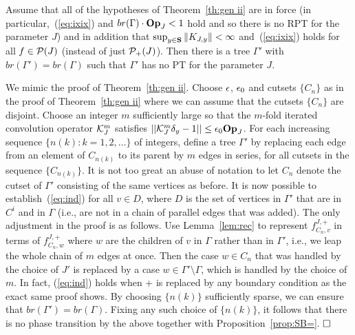 \begin{lem} \label{lem:robust}
Assume that all of the hypotheses of Theorem~\ref{th:gen ii} are in force
(in particular,~(\ref{eq:ixix}) and $\textstyle {br}  (\Gamma) \cdot \op < 1$ 
hold and so there is no RPT for the parameter $J$) and in addition that
$\sup_{y\in \S} \|K_{J,y}\| < \infty$ and~(\ref{eq:ixix}) holds for
all $f\in\PP(J)$ (instead of just $\PP_+(J)$).
Then there is a tree $\Gamma'$ with 
$\textstyle {br} (\Gamma') = \textstyle {br} (\Gamma)$ 
such that $\Gamma'$ has no PT for the parameter $J$.
\end{lem}

  We mimic the proof of Theorem~\ref{th:gen ii}. 
Choose $\eps$, $\eps_0$ and
cutsets $\{ C_n \}$ as in the proof of Theorem~\ref{th:gen ii}
where we can assume that the cutsets $\{ C_n \}$ are disjoint.  
Choose an integer $m$ sufficiently large so that the $m$-fold iterated
convolution operator $\KJ^m$ satisfies 
$||\KJ^m \p_y-1|| \leq \eps_0 \op$.
For each increasing sequence $\{ n(k) : k = 1 , 2 , \ldots \}$ 
of integers, define a tree $\Gamma'$ by replacing each edge from an element
of $C_{n(k)}$ to its parent by $m$ edges in series, for all cutsets 
in the sequence $\{ C_{n(k)} \}$.  It is not too great an abuse of 
notation to let $C_n$ denote the cutset of $\Gamma'$ consisting of 
the same vertices as before.  It is now possible to 
establish~(\ref{eq:ind}) for all $v \in D$, where $D$ is the set of 
vertices in $\Gamma'$ that are in $C^i$ and in $\Gamma$ (i.e., are not
in a chain of parallel edges that was added). 
The only adjustment
in the proof is as follows.  Use Lemma~\ref{lem:rec} to represent
$f^{J , +}_{C_n , v}$ in terms of $f^{J,+}_{C_n , w}$ where $w$
are the children of $v$ in $\Gamma$ rather than in $\Gamma'$, i.e., we leap 
the whole chain of $m$ edges at once.  Then the case $w \in C_n$ that 
was handled by the choice of $J'$ is replaced by a case 
$w \in \Gamma' \setminus \Gamma$, which is handled by the choice of $m$.  
In fact, (\ref{eq:ind}) holds when + is replaced by any boundary condition 
as the exact same proof shows.
By choosing $\{ n(k) \}$ sufficiently sparse, we can ensure that 
$\textstyle {br}  (\Gamma') = \textstyle {br}  (\Gamma)$.  
Fixing any such choice of $\{ n(k) \}$,
it follows that there is no phase transition by the above together with
Proposition~\ref{prop:SB=}.
$\qed$

